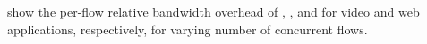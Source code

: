  show the per-flow
relative bandwidth overhead of {\ns},
{\constshape}, and {\pacer} for video and web
applications, respectively, for varying number of concurrent flows.



